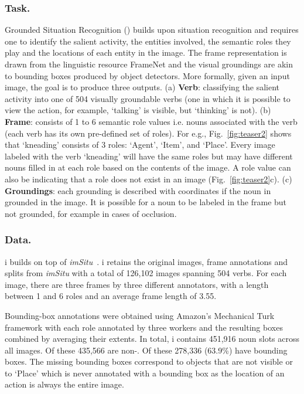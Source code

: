 \documentclass[runningheads]{llncs}
\newcommand{\dataset}{\mbox{\sc{SW}}i\mbox{\sc{G}}\xspace}
\newcommand{\imsitu}{\emph{imSitu}\xspace}
\newcommand{\tasksmall}{\mbox{\sc{GSR}}\xspace}
\begin{document}
\subsubsection{Task. }
Grounded Situation Recognition (\tasksmall) builds upon situation recognition and requires one to identify the salient activity, the entities involved, the semantic roles they play and the locations of each entity in the image. The frame representation is drawn from the linguistic resource FrameNet and the visual groundings are akin to bounding boxes produced by object detectors. More formally, given an input image, the goal is to produce three outputs. (a) \textbf{Verb}: classifying the salient activity into one of 504 visually groundable verbs (one in which it is possible to view the action, for example, ‘talking’ is visible, but ‘thinking’ is not). (b) \textbf{Frame}: consists of 1 to 6 semantic role values i.e. nouns associated with the verb (each verb has its own pre-defined set of roles). For e.g., Fig.~\ref{fig:teaser2} shows that ‘kneading’ consists of 3 roles: ‘Agent’, ‘Item’, and ‘Place’. Every image labeled with the verb ‘kneading’ will have the same roles but may have different nouns filled in at each role based on the contents of the image. A role value can also be  indicating that a role does not exist in an image (Fig.~\ref{fig:teaser2}c). (c) \textbf{Groundings}: each grounding is described with coordinates  if the noun in grounded in the image. It is possible for a noun to be labeled in the frame but not grounded, for example in cases of occlusion.

\subsubsection{Data. }

\dataset{} builds on top of \imsitu{}~\cite{imsitu}. \dataset{} retains the original images, frame annotations and splits from \imsitu{} with a total of 126,102 images spanning 504 verbs. For each image, there are three frames by three different annotators, with a length between 1 and 6 roles and an average frame length of 3.55.


Bounding-box annotations were obtained using Amazon's Mechanical Turk framework with each role annotated by three workers and the resulting boxes combined by averaging their extents. In total, \dataset{} contains 451,916 noun slots across all images. Of these 435,566 are non-. Of these 278,336 (63.9\%) have bounding boxes. The missing bounding boxes correspond to objects that are not visible or to `Place' which is never annotated with a bounding box as the location of an action is always the entire image.
\end{document}
